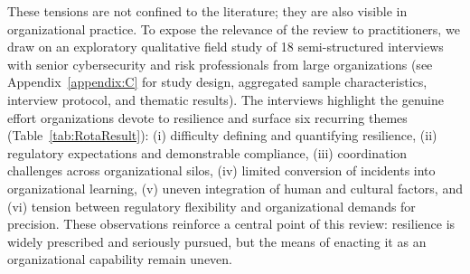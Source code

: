 These tensions are not confined to the literature; they are also visible in organizational practice. To expose the relevance of the review to practitioners, we draw on an exploratory qualitative field study of 18 semi-structured interviews with senior cybersecurity and risk professionals from large organizations \autocite{rota2024} (see Appendix~\ref{appendix:C} for study design, aggregated sample characteristics, interview protocol, and thematic results). The interviews highlight the genuine effort organizations devote to resilience and surface six recurring themes (Table~\ref{tab:RotaResult}): (i) difficulty defining and quantifying resilience, (ii) regulatory expectations and demonstrable compliance, (iii) coordination challenges across organizational silos, (iv) limited conversion of incidents into organizational learning, (v) uneven integration of human and cultural factors, and (vi) tension between regulatory flexibility and organizational demands for precision. These observations reinforce a central point of this review: resilience is widely prescribed and seriously pursued, but the means of enacting it as an organizational capability remain uneven.\\



